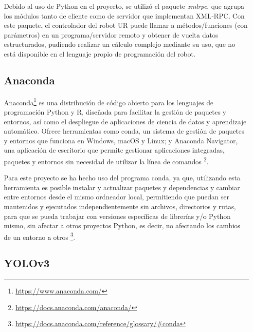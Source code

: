 Debido al uso de Python en el proyecto, se utilizó el paquete \textit{xmlrpc}, que agrupa los módulos tanto de cliente como de servidor que implementan XML-RPC. Con este paquete, el controlador del robot UR puede llamar a métodos/funciones (con parámetros) en un programa/servidor remoto y obtener de vuelta datos estructurados, pudiendo realizar un cálculo complejo mediante su uso, que no está disponible en el lenguaje propio de programación del robot.

\subsection{Anaconda}
\label{sec:Anaconda}

Anaconda\footnote{\url{https://www.anaconda.com/}} es una distribución de código abierto para los lenguajes de programación Python y R, diseñada para facilitar la gestión de paquetes y entornos, así como el despliegue de aplicaciones de ciencia de datos y aprendizaje automático. Ofrece herramientas como conda, un sistema de gestión de paquetes y entornos que funciona en Windows, macOS y Linux; y Anaconda Navigator, una aplicación de escritorio que permite gestionar aplicaciones integradas, paquetes y entornos sin necesidad de utilizar la línea de comandos \footnote{\url{https://docs.anaconda.com/anaconda/}}. 

Para este proyecto se ha hecho uso del programa conda, ya que, utilizando esta herramienta es posible instalar y actualizar paquetes y dependencias y cambiar entre entornos desde el mismo ordneador local, permitiendo que puedan ser mantenidos y ejecutados independientemente sin archivos, directorios y rutas, para que se pueda trabajar con versiones específicas de librerías y/o Python mismo, sin afectar a otros proyectos Python, es decir, no afectando los cambios de un entorno a otros \footnote{\url{https://docs.anaconda.com/reference/glossary/\#conda}}.
\pagebreak

\subsection{YOLOv3}
\label{sec:YOLOv3}

